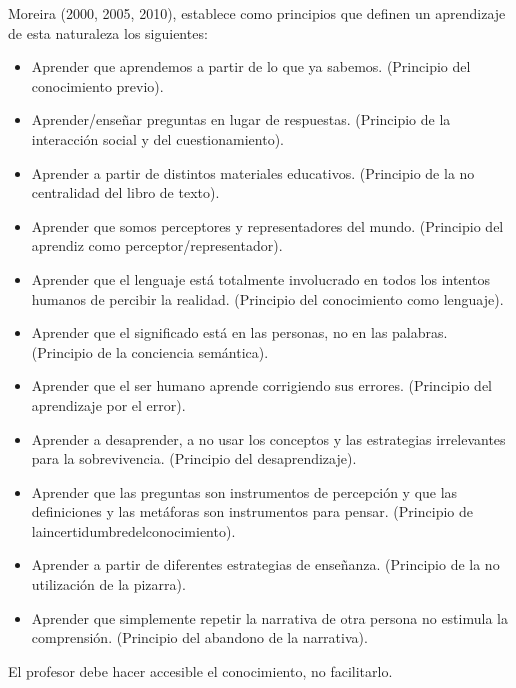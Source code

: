 \documentclass[12pt]{report}
\theoremstyle{largebreak}
\begin{document}
    Moreira (2000, 2005, 2010), establece como principios
    que definen un aprendizaje de esta naturaleza los siguientes:
    \begin{itemize}
        \item Aprender que aprendemos a partir de lo que ya sabemos. (Principio del
        conocimiento previo).
        \item Aprender/enseñar preguntas en lugar de respuestas. (Principio de la
        interacción social y del cuestionamiento).
        \item Aprender a partir de distintos materiales educativos. (Principio de la no
        centralidad del libro de texto).
        \item Aprender que somos perceptores y representadores del mundo. (Principio
        del aprendiz como perceptor/representador).
        \item Aprender que el lenguaje está totalmente involucrado en todos los intentos
        humanos de percibir la realidad. (Principio del conocimiento como
        lenguaje).
        \item Aprender que el significado está en las personas, no en las palabras.
        (Principio de la conciencia semántica).
        \item Aprender que el ser humano aprende corrigiendo sus errores. (Principio del
        aprendizaje por el error).
        \item Aprender a desaprender, a no usar los conceptos y las estrategias
        irrelevantes para la sobrevivencia. (Principio del desaprendizaje).
        \item Aprender que las preguntas son instrumentos de percepción y que las
        definiciones y las metáforas son instrumentos para pensar. (Principio de
        laincertidumbredelconocimiento).
        \item Aprender a partir de diferentes estrategias de enseñanza. (Principio de la
        no utilización de la pizarra).
        \item Aprender que simplemente repetir la narrativa de otra persona no estimula
        la comprensión. (Principio del abandono de la narrativa).
    \end{itemize}

    El profesor debe hacer accesible el conocimiento, no facilitarlo.
\end{document}
